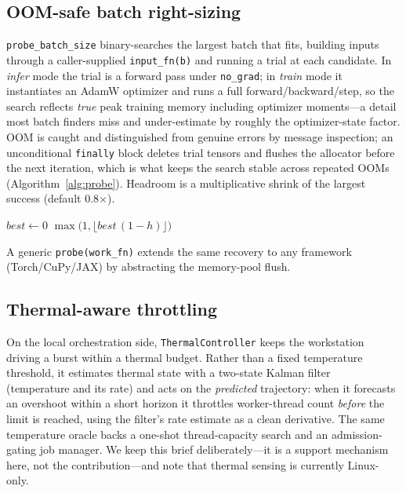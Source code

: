 \documentclass[conference]{IEEEtran}
\begin{document}
\subsection{OOM-safe batch right-sizing}
\texttt{probe\_batch\_size} binary-searches the largest batch that fits, building inputs through a
caller-supplied \texttt{input\_fn(b)} and running a trial at each candidate. In \emph{infer} mode
the trial is a forward pass under \texttt{no\_grad}; in \emph{train} mode it instantiates an AdamW
optimizer and runs a full forward/backward/step, so the search reflects \emph{true} peak training
memory including optimizer moments---a detail most batch finders miss and under-estimate by
roughly the optimizer-state factor. OOM is caught and distinguished from genuine errors by message
inspection; an unconditional \texttt{finally} block deletes trial tensors and flushes the
allocator before the next iteration, which is what keeps the search stable across repeated OOMs
(Algorithm~\ref{alg:probe}). Headroom is a multiplicative shrink of the largest success
(default 0.8$\times$).

\begin{algorithm}[t]
\caption{OOM-safe batch right-sizing (infer mode)}\label{alg:probe}
$best \gets 0$\;
\Return $\max\!\bigl(1,\lfloor best\,(1-h)\rfloor\bigr)$\;
\end{algorithm} A generic
\texttt{probe(work\_fn)} extends the same recovery to any framework (Torch/CuPy/JAX) by abstracting
the memory-pool flush.

\subsection{Thermal-aware throttling}
On the local orchestration side, \texttt{ThermalController} keeps the workstation driving a burst
within a thermal budget. Rather than a fixed temperature threshold, it estimates thermal state
with a two-state Kalman filter~\cite{kalman} (temperature and its rate) and acts on the
\emph{predicted} trajectory: when it forecasts an overshoot within a short horizon it throttles
worker-thread count \emph{before} the limit is reached, using the filter's rate estimate as a clean
derivative. The same temperature oracle backs a one-shot thread-capacity search and an
admission-gating job manager. We keep this brief deliberately---it is a support mechanism here, not
the contribution---and note that thermal sensing is currently Linux-only.
\end{document}
